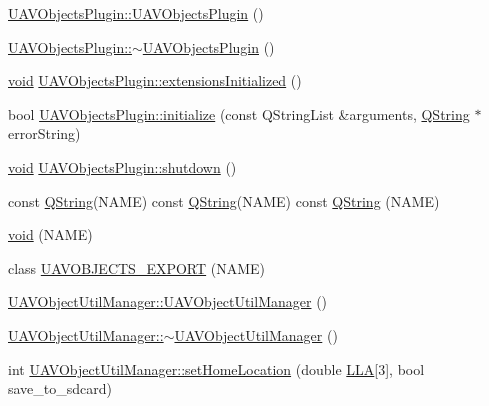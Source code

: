 \begin{DoxyCompactItemize}
\item 
\hyperlink{group___u_a_v_objects_plugin_ga2345b6b23fc30557f18422344213a64d}{\-U\-A\-V\-Objects\-Plugin\-::\-U\-A\-V\-Objects\-Plugin} ()
\item 
\hyperlink{group___u_a_v_objects_plugin_ga34b24d065eef797812c717bde15e7252}{\-U\-A\-V\-Objects\-Plugin\-::$\sim$\-U\-A\-V\-Objects\-Plugin} ()
\item 
\hyperlink{group___u_a_v_objects_plugin_ga444cf2ff3f0ecbe028adce838d373f5c}{void} \hyperlink{group___u_a_v_objects_plugin_ga01c0cfcad9946436827836ba293f07b0}{\-U\-A\-V\-Objects\-Plugin\-::extensions\-Initialized} ()
\item 
bool \hyperlink{group___u_a_v_objects_plugin_ga782e9362e4a727e032c97865d0841820}{\-U\-A\-V\-Objects\-Plugin\-::initialize} (const \-Q\-String\-List \&arguments, \hyperlink{group___u_a_v_objects_plugin_gab9d252f49c333c94a72f97ce3105a32d}{\-Q\-String} $\ast$error\-String)
\item 
\hyperlink{group___u_a_v_objects_plugin_ga444cf2ff3f0ecbe028adce838d373f5c}{void} \hyperlink{group___u_a_v_objects_plugin_gab62f36eaf3f542f980ef1d88c29bd05a}{\-U\-A\-V\-Objects\-Plugin\-::shutdown} ()
\item 
const \hyperlink{group___u_a_v_objects_plugin_gab9d252f49c333c94a72f97ce3105a32d}{\-Q\-String}(\-N\-A\-M\-E) const \*
\hyperlink{group___u_a_v_objects_plugin_gab9d252f49c333c94a72f97ce3105a32d}{\-Q\-String}(\-N\-A\-M\-E) const \hyperlink{group___u_a_v_objects_plugin_gab9d252f49c333c94a72f97ce3105a32d}{\-Q\-String} (\-N\-A\-M\-E)
\item 
\hyperlink{group___u_a_v_objects_plugin_ga444cf2ff3f0ecbe028adce838d373f5c}{void} (\-N\-A\-M\-E)
\item 
class \hyperlink{group___u_a_v_objects_plugin_ga8e1338dbe9b6e321c7255a704c4a2968}{\-U\-A\-V\-O\-B\-J\-E\-C\-T\-S\-\_\-\-E\-X\-P\-O\-R\-T} (\-N\-A\-M\-E)
\item 
\hyperlink{group___u_a_v_objects_plugin_gaa646568941e8ce857e188b39c90cef6d}{\-U\-A\-V\-Object\-Util\-Manager\-::\-U\-A\-V\-Object\-Util\-Manager} ()
\item 
\hyperlink{group___u_a_v_objects_plugin_gaffdcd54a6b9ce6a7dcf10beb881f71a7}{\-U\-A\-V\-Object\-Util\-Manager\-::$\sim$\-U\-A\-V\-Object\-Util\-Manager} ()
\item 
int \hyperlink{group___u_a_v_objects_plugin_gafcfa22c5812ed36ca7a2d6e442ba1710}{\-U\-A\-V\-Object\-Util\-Manager\-::set\-Home\-Location} (double \hyperlink{_o_p_plots_8m_ac4d07718b2724e836be86fbe0c8c5704}{\-L\-L\-A}\mbox{[}3\mbox{]}, bool save\-\_\-to\-\_\-sdcard)

\end{DoxyCompactItemize}
